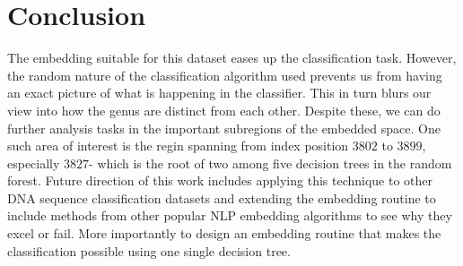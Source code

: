 \documentclass[oneside, twocolumn, a4paper, 10pt]{IEEEtran}
\begin{document}
\section{Conclusion}
The embedding suitable for this dataset eases up the classification task. However, the random nature of the classification algorithm used prevents us from having an exact picture of what is happening in the classifier. This in turn blurs our view into how the genus are distinct from each other. Despite these, we can do further analysis tasks in the important subregions of the embedded space. One such area of interest is the regin spanning from index position $3802$ to $3899$, especially $3827$- which is the root of two among five decision trees in the random forest. Future direction of this work includes applying this technique to other DNA sequence classification datasets and extending the embedding routine to include methods from other popular NLP embedding algorithms to see why they excel or fail. More importantly to design an embedding routine that makes the classification possible using one single decision tree.
%
\end{document}
